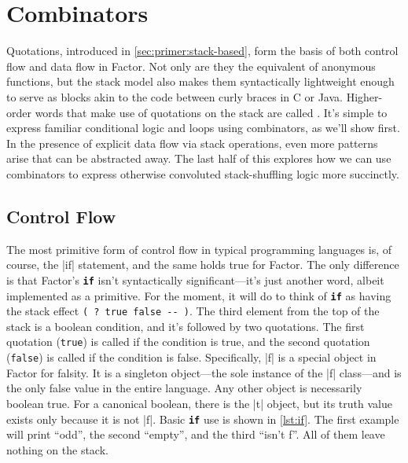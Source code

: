 \section{Combinators}\label{sec:primer:combinators}

Quotations, introduced in \cref{sec:primer:stack-based}, form the basis of both
control flow and data flow in Factor.  Not only are they the equivalent of
anonymous functions, but the stack model also makes them syntactically
lightweight enough to serve as blocks akin to the code between curly braces in
C or Java.  Higher-order words that make use of quotations on the stack are
called .  It's simple to express familiar conditional logic
and loops using combinators, as we'll show first.  In the presence of explicit
data flow via stack operations, even more patterns arise that can be abstracted
away.  The last half of this  explores how
we can use combinators to express otherwise convoluted stack-shuffling logic
more succinctly.

\subsection{Control Flow}\label{sec:primer:control-flow}

The most primitive form of control flow in typical programming languages is, of
course, the |if| statement, and the same holds true for Factor.  The
only difference is that Factor's \texttt{\textbf{if}} isn't syntactically
significant---it's just another word, albeit implemented as a primitive.  For
the moment, it will do to think of \texttt{\textbf{if}} as having the stack
effect
%
\Verb|( ? true false -- )|.
%
The third element from the top of the stack is a boolean condition, and it's
followed by two quotations.  The first quotation (\Verb|true|) is called if the
condition is true, and the second quotation (\Verb|false|) is called if the
condition is false.  Specifically, \factor|f| is a special object in Factor for
falsity.  It is a singleton object---the sole instance of the \factor|f|
class---and is the only false value in the entire language.  Any other object
is necessarily boolean true.  For a canonical boolean, there is the \factor|t|
object, but its truth value exists only because it is not \factor|f|.  Basic
\texttt{\textbf{if}} use is shown in \vref{lst:if}.  The first example will
print ``odd'', the second ``empty'', and the third ``isn't f''.  All of them
leave nothing on the stack.

